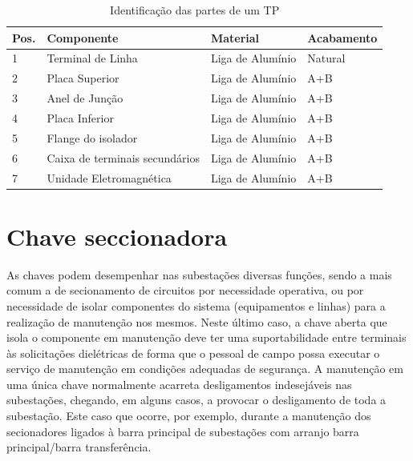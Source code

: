\documentclass[a5paper,english,spanish,brazil]{ufsc-thesis}
\begin{document}
\begin{longtable}{|l|l|l|l|}
\caption{Identificação das partes de um TP}
\\ \hline
  Pos. & Componente & Material & Acabamento \\ \hline
  1 & Terminal de Linha & Liga de Alumínio & Natural \\ \hline
  2 & Placa Superior & Liga de Alumínio & A+B \\ \hline
  3 & Anel de Junção & Liga de Alumínio & A+B \\ \hline
  4 & Placa Inferior & Liga de Alumínio & A+B \\ \hline
  5 & Flange do isolador & Liga de Alumínio & A+B \\ \hline
  6 & Caixa de terminais secundários & Liga de Alumínio & A+B \\ \hline
  7 & Unidade Eletromagnética & Liga de Alumínio & A+B \\ \hline
\end{longtable}

\section{Chave seccionadora}
As chaves podem desempenhar nas subestações diversas funções, sendo a mais comum a de secionamento de circuitos por necessidade operativa, ou por necessidade de isolar componentes do sistema (equipamentos e linhas) para a realização de manutenção nos mesmos. Neste último caso, a chave aberta que isola o componente em manutenção deve ter uma suportabilidade entre terminais às solicitações dielétricas de forma que o pessoal de campo possa executar o serviço de manutenção em condições adequadas de segurança. A manutenção em uma única chave normalmente acarreta desligamentos indesejáveis nas subestações, chegando, em alguns casos, a provocar o desligamento de toda a subestação. Este caso que ocorre, por exemplo, durante a manutenção dos secionadores ligados à barra principal de subestações com arranjo barra principal/barra transferência.
\end{document}
